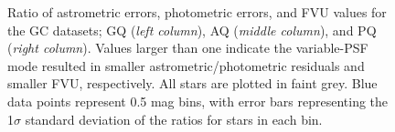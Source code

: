 \documentclass[]{spie}  %
\begin{document}
\begin{figure}[!h]
  \hspace{-1.54cm}
  \caption{\footnotesize Ratio of astrometric errors, photometric errors, and FVU values for the GC datasets; GQ (\textit{left column}), AQ (\textit{middle column}), and PQ (\textit{right column}). Values larger than one indicate the variable-PSF mode resulted in smaller astrometric/photometric residuals and smaller FVU, respectively. All stars are plotted in faint grey. Blue data points represent 0.5 mag bins, with error bars representing the 1$\sigma$ standard deviation of the ratios for stars in each bin.} \label{fig:gc-astrom}
\end{figure}
\end{document}
